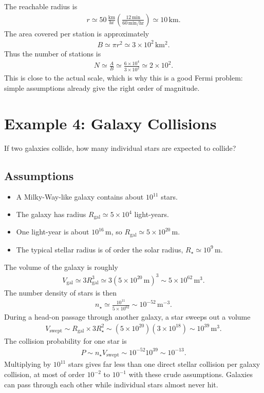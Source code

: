 \documentclass[12pt]{article}
\newcommand{\be}{\begin{eqnarray}}
\newcommand{\ee}{\end{eqnarray}}
\begin{document}
The reachable radius is
\be
r \simeq
50\,\frac{\mathrm{km}}{\mathrm{hr}}
\left(\frac{12\,\mathrm{min}}{60\,\mathrm{min/hr}}\right)
\simeq 10\,\mathrm{km}.
\ee
The area covered per station is approximately
\be
B \simeq \pi r^2 \simeq 3\times 10^2\,\mathrm{km^2}.
\ee
Thus the number of stations is
\be
N \simeq \frac{A}{B}
\simeq
\frac{6\times 10^4}{3\times 10^2}
\simeq 2\times 10^2.
\ee
This is close to the actual scale, which is why this is a good Fermi problem: simple assumptions already give the right order of magnitude.

\section{Example 4: Galaxy Collisions}
If two galaxies collide, how many individual stars are expected to collide?

\subsection*{Assumptions}
\begin{itemize}
    \item A Milky-Way-like galaxy contains about $10^{11}$ stars.
    \item The galaxy has radius $R_{\mathrm{gal}}\simeq 5\times 10^4$ light-years.
    \item One light-year is about $10^{16}\,\mathrm{m}$, so $R_{\mathrm{gal}}\simeq 5\times 10^{20}\,\mathrm{m}$.
    \item The typical stellar radius is of order the solar radius, $R_{\star}\simeq 10^9\,\mathrm{m}$.
\end{itemize}

The volume of the galaxy is roughly
\be
V_{\mathrm{gal}} \simeq 3R_{\mathrm{gal}}^3
\simeq 3(5\times 10^{20}\,\mathrm{m})^3
\sim 5\times 10^{62}\,\mathrm{m^3}.
\ee
The number density of stars is then
\be
n_{\star} \simeq \frac{10^{11}}{5\times 10^{62}}
\sim 10^{-52}\,\mathrm{m^{-3}}.
\ee
During a head-on passage through another galaxy, a star sweeps out a volume
\be
V_{\mathrm{swept}}
\sim R_{\mathrm{gal}} \times 3R_{\star}^2
\sim (5\times 10^{20})(3\times 10^{18})
\sim 10^{39}\,\mathrm{m^3}.
\ee
The collision probability for one star is
\be
P \sim n_{\star}V_{\mathrm{swept}}
\sim 10^{-52}10^{39}
\sim 10^{-13}.
\ee
Multiplying by $10^{11}$ stars gives far less than one direct stellar collision per galaxy collision, at most of order $10^{-2}$ to $10^{-1}$ with these crude assumptions. Galaxies can pass through each other while individual stars almost never hit.
\end{document}
